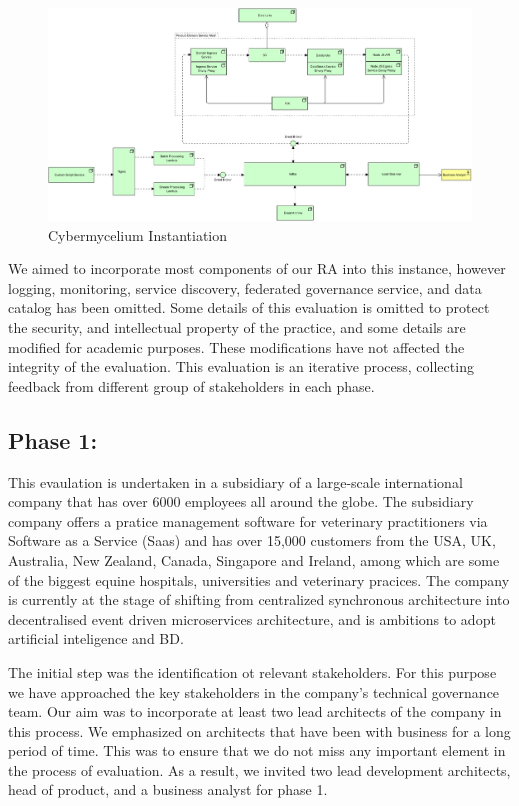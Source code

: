 \documentclass[review]{elsarticle}
\begin{document}
\begin{figure}
    \includegraphics[width=23cm]{Media/concrete-mycelium.jpg}
    \caption{Cybermycelium Instantiation}
    \label{fig:ConcreteCyberMycelium}
\end{figure}

We aimed to incorporate most components of our RA into this instance, however logging, monitoring, service discovery, federated governance service, and data catalog has been omitted. Some details of this evaluation is omitted to protect the security, and intellectual property of the practice, and some details are modified for academic purposes. These modifications have not affected the integrity of the evaluation. This evaluation is an iterative process, collecting feedback from different group of stakeholders in each phase. 

\subsection{Phase 1:}

This evaulation is undertaken in a subsidiary of a large-scale international company that has over 6000 employees all around the globe. The subsidiary company offers a pratice management software for veterinary practitioners via Software as a Service (Saas) and has over 15,000 customers from the USA, UK, Australia, New Zealand, Canada, Singapore and Ireland, among which are some of the biggest equine hospitals, universities and veterinary pracices. The company is currently at the stage of shifting from centralized synchronous architecture into decentralised event driven microservices architecture, and is ambitions to adopt artificial inteligence and BD.

The initial step was the identification ot relevant stakeholders. For this purpose we have approached the key stakeholders in the company's technical governance team. Our aim was to incorporate at least two lead architects of the company in this process. We emphasized on architects that have been with business for a long period of time. This was to ensure that we do not miss any important element in the process of evaluation. As a result, we invited two lead development architects, head of product, and a business analyst for phase 1.
\end{document}
